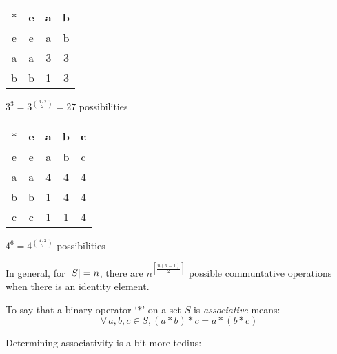 \documentclass[letterpaper,12pt,fleqn]{article}
\begin{document}
\begin{tabular}{c|ccc}
  $*$ & e & a & b \\
  \hline
  e & e & a & b \\
  a & a & 3 & 3 \\
  b & b & 1 & 3 \\
\end{tabular}\hspace{0.25in}
$3^3=3^{\left(\frac{3\cdot2}{2}\right)}=27$ possibilities

\begin{tabular}{c|cccc}
  $*$ & e & a & b & c \\
  \hline
  e & e & a & b & c \\
  a & a & 4 & 4 & 4 \\
  b & b & 1 & 4 & 4 \\
  c & c & 1 & 1 & 4 \\
\end{tabular}\hspace{0.25in}
$4^6=4^{\left(\frac{4\cdot3}{2}\right)}$ possibilities

\bigskip
  
In general, for $\lvert S\rvert=n$, there are $n^{\left[\frac{n(n-1)}{2}\right]}$ possible
communtative operations when there is an identity element.

\begin{definition}
  To say that a binary operator `$*$' on a set $S$ is \emph{associative} means:
  \[\forall\,a,b,c\in S,(a*b)*c=a*(b*c)\]
\end{definition}

Determining associativity is a bit more tedius:
\end{document}
